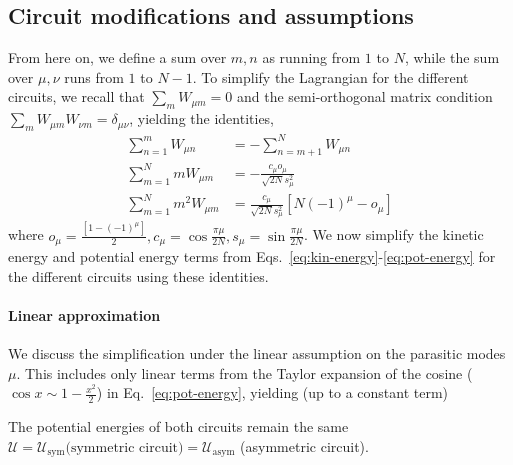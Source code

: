 \documentclass[%
reprint,
superscriptaddress,
 amsmath,amssymb,
 aps,
 prx,
longbibliography,
floatfix,
]{revtex4-2}
\begin{document}
\subsection{Circuit modifications and assumptions}
From here on, we define a sum over $m,n$ as running from $1$ to $N$, while the sum over $\mu,\nu$ runs from $1$ to $N-1$. To simplify the Lagrangian for the different circuits, we recall that $\sum_m W_{\mu m}=0$ and the semi-orthogonal matrix condition $\sum_m W_{\mu m}W_{\nu m}=\delta_{\mu\nu}$, yielding the identities,
\begin{align}
 \sum_{n=1}^m W_{\mu n}&=-\sum_{n=m+1}^N W_{\mu n}\\
 \sum_{m=1}^N mW_{\mu m}&=-\frac{c_\mu o_{\mu}}{\sqrt{2N}s_\mu^2}\\
 \sum_{m=1}^N m^2W_{\mu m}&=\frac{c_\mu}{\sqrt{2N}s_\mu^2}[N(-1)^\mu-o_\mu]
\end{align}
where $o_\mu=\frac{[1-(-1)^\mu]}{2}, c_\mu=\cos{\frac{\pi\mu}{2N}}, s_\mu=\sin{\frac{\pi\mu}{2N}}$. We now simplify the kinetic energy and potential energy terms from Eqs.~\ref{eq:kin-energy}-\ref{eq:pot-energy} for the different circuits using these identities.
\paragraph{Linear approximation}
We discuss the simplification under the linear assumption on the parasitic modes $\mu$. This includes only linear terms from the Taylor expansion of the cosine ($\cos{x}\sim 1-\frac{x^2}{2}$) in Eq.~\ref{eq:pot-energy}, yielding (up to a constant term)

The potential energies of both circuits remain the same $\mathcal{U}=\mathcal{U}_\textrm{sym} \textrm{(symmetric circuit)}=\mathcal{U}_\textrm{asym}$ \textrm{(asymmetric circuit)}.
\end{document}
